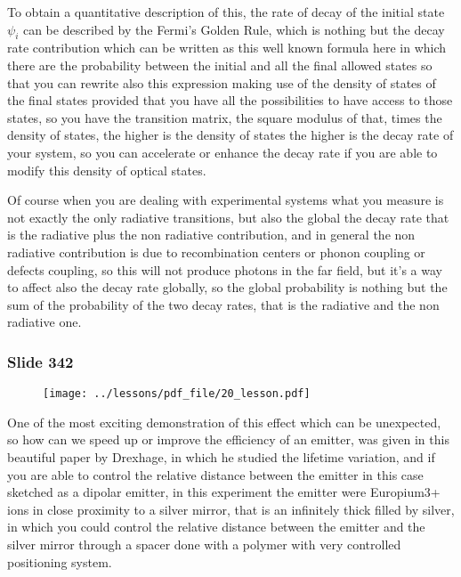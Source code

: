 \documentclass[../main/main.tex]{subfiles}
\begin{document}
To obtain a quantitative description of this, the rate of decay of the initial state $\psi_i$ can be described by the Fermi's Golden Rule, which is nothing but the decay rate contribution which can be written as this well known formula here in which there are the probability between the initial and all the final allowed states so that you can rewrite also this expression making use of the density of states of the final states provided that you have all the possibilities to have access to those states, so you have the transition matrix, the square modulus of that, times the density of states, the higher is the density of states the higher is the decay rate of your system, so you can accelerate or enhance the decay rate if you are able to modify this density of optical states.

Of course when you are dealing with experimental systems what you measure is not exactly the only radiative transitions, but also the global the decay rate that is the radiative plus the non radiative contribution, and in general the non radiative contribution is due to recombination centers or phonon coupling or defects coupling, so this will not produce photons in the far field, but it's a way to affect also the decay rate globally, so the global probability is nothing but the sum of the probability of the two decay rates, that is the radiative and the non radiative one.

\newpage

\subsubsection{Slide 342}

\begin{figure}[h!]
\centering
\texttt{[image: ../lessons/pdf\_file/20\_lesson.pdf]}
\end{figure}

One of the most exciting demonstration of this effect which can be unexpected, so how can we speed up or improve the efficiency of an emitter, was given in this beautiful paper by Drexhage, in which he studied the lifetime variation, and if you are able to control the relative distance between the emitter in this case sketched as a dipolar emitter, in this experiment the emitter were Europium3+ ions in close proximity to a silver mirror, that is an infinitely thick filled by silver, in which you could control the relative distance between the emitter and the silver mirror through a spacer done with a polymer with very controlled positioning system.
\end{document}

